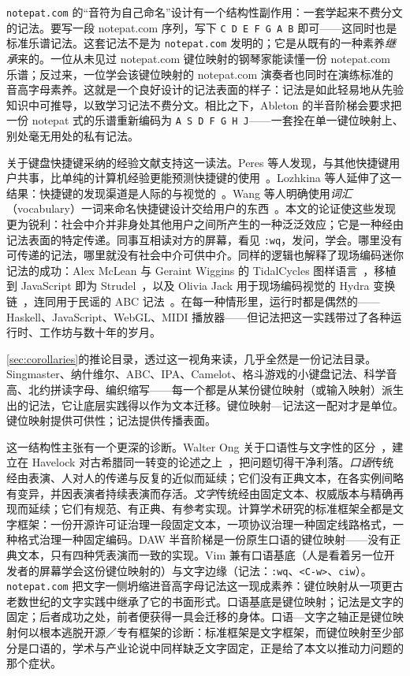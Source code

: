 \documentclass[10pt,letterpaper,twocolumn]{article}
\begin{document}
\texttt{notepat.com} 的“音符为自己命名”设计有一个结构性副作用：一套学起来不费分文的记法。要写一段 notepat.com 序列，写下 \texttt{C D E F G A B} 即可——这同时也是标准乐谱记法。这套记法不是为 \texttt{notepat.com} 发明的；它是从既有的一种素养\emph{继承}来的。一位从未见过 notepat.com 键位映射的钢琴家能读懂一份 notepat.com 乐谱；反过来，一位学会该键位映射的 notepat.com 演奏者也同时在演练标准的音高字母素养。这就是一个良好设计的记法表面的样子：记法是如此轻易地从先验知识中可推导，以致学习记法不费分文。相比之下，Ableton 的半音阶梯会要求把一份 notepat 式的乐谱重新编码为 \texttt{A S D F G H J}——一套拴在单一键位映射上、别处毫无用处的私有记法。

关于键盘快捷键采纳的经验文献支持这一读法。Peres 等人发现，与其他快捷键用户共事，比单纯的计算机经验更能预测快捷键的使用~\citep{peres2004shortcut}。Lozhkina 等人延伸了这一结果：快捷键的发现渠道是人际的与视觉的~\citep{lozhkina2025discovery}。Wang 等人明确使用\emph{词汇}（vocabulary）一词来命名快捷键设计交给用户的东西~\citep{wang2020keymap}。本文的论证使这些发现更为锐利：社会中介并非身处其他用户之间所产生的一种泛泛效应；它是一种经由记法表面的特定传递。同事互相读对方的屏幕，看见 \texttt{:wq}，发问，学会。哪里没有可传递的记法，哪里就没有社会中介可供中介。同样的逻辑也解释了现场编码迷你记法的成功：Alex McLean 与 Geraint Wiggins 的 TidalCycles 图样语言~\citep{mclean2010tidal}，移植到 JavaScript 即为 Strudel~\citep{roos2023strudel}，以及 Olivia Jack 用于现场编码视觉的 Hydra 变换链~\citep{jack2018hydra}，连同用于民谣的 ABC 记法~\citep{walshaw_abc}。在每一种情形里，运行时都是偶然的——Haskell、JavaScript、WebGL、MIDI 播放器——但记法把这一实践带过了各种运行时、工作坊与数十年的岁月。

\textsection\ref{sec:corollaries}的推论目录，透过这一视角来读，几乎全然是一份记法目录。Singmaster、纳什维尔、ABC、IPA、Camelot、格斗游戏的小键盘记法、科学音高、北约拼读字母、编织缩写——每一个都是从某份键位映射（或输入映射）派生出的记法，它让底层实践得以作为文本迁移。键位映射—记法这一配对才是单位。键位映射提供可供性；记法提供传播表面。

这一结构性主张有一个更深的诊断。Walter Ong 关于口语性与文字性的区分~\citep{ong1982orality}，建立在 Havelock 对古希腊同一转变的论述之上~\citep{havelock1963preface}，把问题切得干净利落。\emph{口语}传统经由表演、人对人的传递与反复的近似而延续；它们没有正典文本，在各实例间略有变异，并因表演者持续表演而存活。\emph{文字}传统经由固定文本、权威版本与精确再现而延续；它们有规范、有正典、有参考实现。计算学术研究的标准框架全都是文字框架：一份开源许可证治理一段固定文本，一项协议治理一种固定线路格式，一种格式治理一种固定编码。DAW 半音阶梯是一份原生口语的键位映射——没有正典文本，只有四种凭表演而一致的实现。Vim 兼有口语基底（人是看着另一位开发者的屏幕学会这份键位映射的）与文字边缘（记法：\texttt{:wq}、\texttt{<C-w>}、\texttt{ciw}）。\texttt{notepat.com} 把文字一侧坍缩进音高字母记法这一现成素养：键位映射从一项更古老数世纪的文字实践中继承了它的书面形式。口语基底是键位映射；记法是文字的固定；后者成功之处，前者便获得一具会迁移的身体。口语—文字之轴正是键位映射何以根本逃脱开源／专有框架的诊断：标准框架是文字框架，而键位映射至少部分是口语的，学术与产业论说中同样缺乏文字固定，正是给了本文以推动力问题的那个症状。
\end{document}
